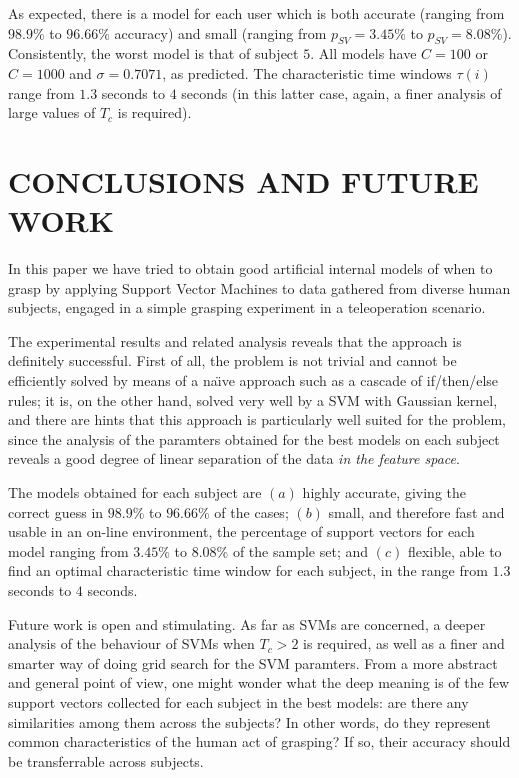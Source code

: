 \documentclass[a4paper,10pt,conference]{ieeeconf}
\begin{document}
As expected, there is a model for each user which is both accurate
(ranging from $98.9\%$ to $96.66\%$ accuracy) and small (ranging from
$p_{SV}=3.45\%$ to $p_{SV}=8.08\%$). Consistently, the worst model is
that of subject $5$. All models have $C=100$ or $C=1000$ and
$\sigma=0.7071$, as predicted. The characteristic time windows
$\tau(i)$ range from $1.3$ seconds to $4$ seconds (in this latter
case, again, a finer analysis of large values of $T_c$ is required).

\section{CONCLUSIONS AND FUTURE WORK}
\label{sec:con}

In this paper we have tried to obtain good artificial internal models
of when to grasp by applying Support Vector Machines to data gathered
from diverse human subjects, engaged in a simple grasping experiment in
a teleoperation scenario.

The experimental results and related analysis reveals that the
approach is definitely successful. First of all, the problem is not
trivial and cannot be efficiently solved by means of a na\"\i ve
approach such as a cascade of if/then/else rules; it is, on the other
hand, solved very well by a SVM with Gaussian kernel, and there are
hints that this approach is particularly well suited for the problem,
since the analysis of the paramters obtained for the best models on
each subject reveals a good degree of linear separation of the data
\emph{in the feature space}.

The models obtained for each subject are $(a)$ highly accurate, giving
the correct guess in $98.9\%$ to $96.66\%$ of the cases; $(b)$ small,
and therefore fast and usable in an on-line environment, the
percentage of support vectors for each model ranging from $3.45\%$ to
$8.08\%$ of the sample set; and $(c)$ flexible, able to find an
optimal characteristic time window for each subject, in the range from
$1.3$ seconds to $4$ seconds.

Future work is open and stimulating. As far as SVMs are concerned, a
deeper analysis of the behaviour of SVMs when $T_c>2$ is required, as
well as a finer and smarter way of doing grid search for the SVM
paramters. From a more abstract and general point of view, one might
wonder what the deep meaning is of the few support vectors collected
for each subject in the best models: are there any similarities among
them across the subjects? In other words, do they represent common
characteristics of the human act of grasping? If so, their accuracy
should be transferrable across subjects.
\end{document}
